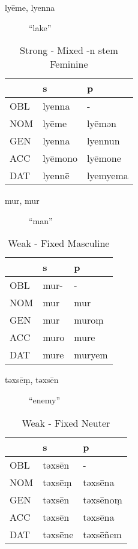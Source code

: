 \documentclass[11pt,a4paper]{article}
\begin{document}
\begin{enumerate}
\begin{description}
\item[{lyēme, lyenna}] ``lake''
\end{description}
\begin{table}[htbp]
\caption{Strong - Mixed -n stem Feminine}
\centering
\begin{tabular}{lll}
 & s & p\\
\hline
OBL & lyenna & -\\
NOM & lyēme & lyēmən\\
GEN & lyenna & lyennun\\
ACC & lyēmono & lyēmone\\
DAT & lyennē & lyemyema\\
\end{tabular}
\end{table}

\begin{description}
\item[{mur, mur}] ``man''
\end{description}
\begin{table}[htbp]
\caption{Weak - Fixed Masculine}
\centering
\begin{tabular}{lll}
 & s & p\\
\hline
OBL & mur- & -\\
NOM & mur & mur\\
GEN & mur & muroṃ\\
ACC & muro & mure\\
DAT & mure & muryem\\
\end{tabular}
\end{table}

\begin{description}
\item[{təxsēṃ, təxsēn}] ``enemy''
\end{description}
\begin{table}[htbp]
\caption{Weak - Fixed Neuter}
\centering
\begin{tabular}{lll}
 & s & p\\
\hline
OBL & təxsēn & -\\
NOM & təxsēṃ & təxsēna\\
GEN & təxsēn & təxsēnoṃ\\
ACC & təxsēn & təxsēna\\
DAT & təxsēne & təxsēñem\\
\end{tabular}
\end{table}


\end{enumerate}
\end{document}
